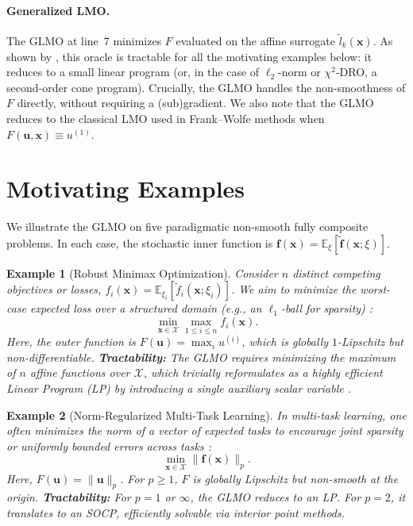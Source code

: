\documentclass{article}
\newcommand{\cX}{\mathcal{X}}
\def\vf{{\bm{f}}}
\def\vu{{\bm{u}}}
\def\vx{{\bm{x}}}
\newcommand{\E}{\mathbb{E}}
\newtheorem{example}{Example}
\begin{document}
\paragraph{Generalized LMO.}
The GLMO at line~7 minimizes $F$ evaluated on the affine surrogate $\tilde l_k(\vx)$. As shown by \citet{vladarean2023first}, this oracle is tractable for all the motivating examples below: it reduces to a small linear program (or, in the case of $\ell_2$-norm or $\chi^2$-DRO, a second-order cone program). Crucially, the GLMO handles the non-smoothness of $F$ directly, without requiring a (sub)gradient.
We also note that the GLMO reduces to the classical LMO used in Frank--Wolfe methods \citep{frank1956algorithm,jaggi2013revisiting} when $F(\vu, \vx) \equiv u^{(1)}$.

\section{Motivating Examples}

We illustrate the GLMO on five paradigmatic non-smooth fully composite problems. In each case, the stochastic inner function is $\vf(\vx) = \E_\xi[\tilde\vf(\vx; \xi)]$.

\begin{example}[Robust Minimax Optimization]
Consider $n$ distinct competing objectives or losses, $f_i(\vx) = \E_{\xi_i}[\tilde{f}_i(\vx; \xi_i)]$. We aim to minimize the worst-case expected loss over a structured domain (e.g., an $\ell_1$-ball for sparsity) \citep{shalev2016minimizing}:
\begin{equation}
    \min_{\vx \in \cX} \max_{1 \le i \le n} f_i(\vx).
\end{equation}
Here, the outer function is $F(\vu) = \max_i u^{(i)}$, which is globally $1$-Lipschitz but non-differentiable. \textbf{Tractability:} The GLMO requires minimizing the maximum of $n$ affine functions over $\cX$, which trivially reformulates as a highly efficient Linear Program (LP) by introducing a single auxiliary scalar variable \citep{vladarean2023first}.
\end{example}


\begin{example}[Norm-Regularized Multi-Task Learning]
In multi-task learning, one often minimizes the norm of a vector of expected tasks to encourage joint sparsity or uniformly bounded errors across tasks \citep{sener2018multi}:
\begin{equation}
    \min_{\vx \in \cX} \|\vf(\vx)\|_p.
\end{equation}
Here, $F(\vu) = \|\vu\|_p$. For $p \ge 1$, $F$ is globally Lipschitz but non-smooth at the origin. \textbf{Tractability:} For $p=1$ or $\infty$, the GLMO reduces to an LP. For $p=2$, it translates to an SOCP, efficiently solvable via interior point methods.
\end{example}
\end{document}
